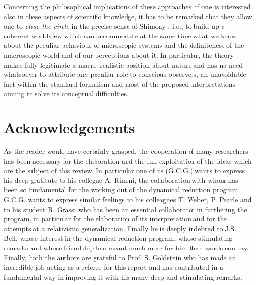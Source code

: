 \documentclass[12pt]{article}
\begin{document}
Concerning the philosophical implications of these approaches, if
one is interested also in these aspects of scientific knowledge,
it has to be remarked that they allow one to {\it close the circle}
in the precise sense of Shimony \cite{shipcqf}, i.e., to build up
a coherent worldview which can accommodate  at the same time what
we know about the peculiar behaviour of microscopic systems and
the definiteness of the macroscopic world and of our perceptions
about it. In particular, the theory makes fully legitimate a
macro--realistic position about nature and has no need whatsoever
to attribute any peculiar role to conscious observers, an
unavoidable fact within the standard formalism and most of the
proposed interpretations aiming to solve its conceptual
difficulties.

\section*{Acknowledgements}

As the reader would have certainly grasped, the cooperation of
many researchers has been necessary for the elaboration and the
full exploitation of the ideas which are the subject of this
review. In particular one of us (G.C.G.) wants to express his deep
gratitute to his collegue  A. Rimini, the collaboration with whom
has been so fundamental for the working out of the dynamical
reduction program. G.C.G. wants to express similar feelings to his
colleagues T. Weber, P. Pearle and to his student R. Grassi who
has been an essential collaborator in furthering the program, in
particular for the elaboration of its interpretation and for the
attempts at a relativistic generalization. Finally he is deeply
indebted to J.S. Bell, whose interest in the dynamical reduction
program, whose stimulating remarks and whose friendship has meant
much more for him than words can say. Finally, both the authors
are grateful to Prof. S. Goldstein who has made an incredible job
acting as a referee for this report and has contributed in a
fundamental way in improving it with his many deep and stimulating
remarks.
\end{document}
